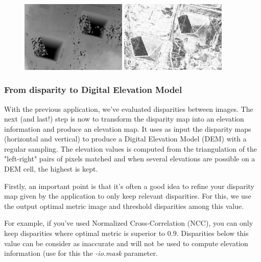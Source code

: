 \begin{figure}[!h]
  \center
  \includegraphics[width=0.45\textwidth]{../Art/MonteverdiImages/stereo_disparity_horizontal.png}
  \includegraphics[width=0.45\textwidth]{../Art/MonteverdiImages/stereo_disparity_metric.png}
  \label{fig:EpipolarImages}
\end{figure}

\subsubsection{From disparity to Digital Elevation Model}

With the previous application, we've evaluated disparities between images. The
next (and last!) step is now to transform the disparity map into an elevation
information and produce an elevation map. It uses as input the disparity maps
(horizontal and vertical) to produce a Digital Elevation Model (DEM) with a
regular sampling. The elevation values is computed from the triangulation of the
"left-right" pairs of pixels matched and when several elevations are possible on
a DEM cell, the highest is kept.

Firstly, an important point is that it's often a good idea to refine your disparity
map given by the  application to only keep relevant
disparities. For this, we use the output optimal metric image and threshold
disparities among this value.

For example, if you've used Normalized Cross-Correlation (NCC), you can only
keep disparities where optimal metric is superior to $0.9$. Disparities below
this value can be consider as inaccurate and will not be used to compute
elevation information (use for this the \textit{-io.mask} parameter.

